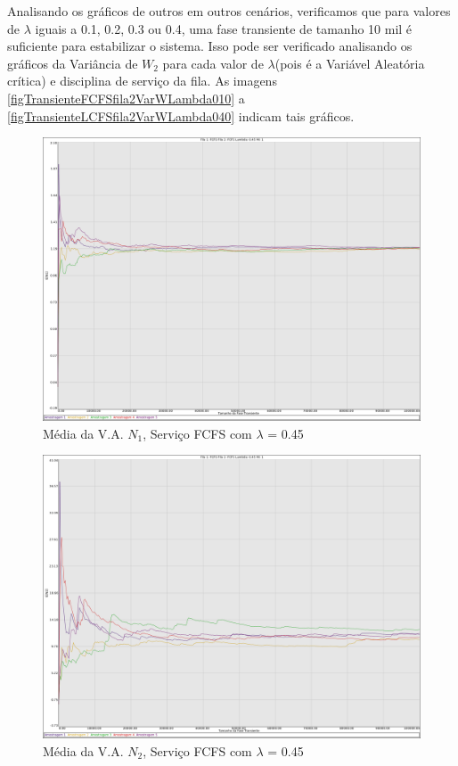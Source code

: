 \documentclass[a4paper,10pt]{article}
\begin{document}
    Analisando os gráficos de outros em outros cenários, verificamos que para valores de $\lambda$ iguais a 0.1, 0.2, 0.3 ou 0.4, uma fase transiente de tamanho
10 mil é suficiente para estabilizar o sistema. Isso pode ser verificado analisando os gráficos da Variância de $W_2$ para cada valor de $\lambda$(pois é a Variável Aleatória crítica) e disciplina
de serviço da fila. As imagens \ref{figTransienteFCFSfila2VarWLambda010} a \ref{figTransienteLCFSfila2VarWLambda040} indicam tais gráficos.

\pagebreak

\begin{figure}
	\caption{Média da V.A. $N_1$, Serviço FCFS com $\lambda$ = 0.45}
	\label{figTransienteFCFSfila1N}
	\includegraphics[scale = 0.20]{./graficos_transiente_1/FCFS/01.png}
\end{figure}

\begin{figure}
	\caption{Média da V.A. $N_2$, Serviço FCFS com $\lambda$ = 0.45}
	\label{figTransienteFCFSfila2N}
	\includegraphics[scale = 0.20]{./graficos_transiente_1/FCFS/02.png}
\end{figure}
\end{document}
